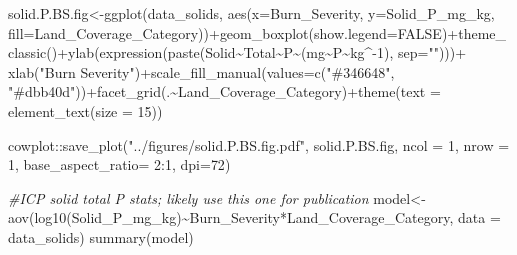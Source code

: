 \documentclass[
]{article}
\newenvironment{Shaded}{\begin{snugshade}}{\end{snugshade}}
\newcommand{\AttributeTok}[1]{\textcolor[rgb]{0.77,0.63,0.00}{#1}}
\newcommand{\CommentTok}[1]{\textcolor[rgb]{0.56,0.35,0.01}{\textit{#1}}}
\newcommand{\ConstantTok}[1]{\textcolor[rgb]{0.00,0.00,0.00}{#1}}
\newcommand{\DecValTok}[1]{\textcolor[rgb]{0.00,0.00,0.81}{#1}}
\newcommand{\FunctionTok}[1]{\textcolor[rgb]{0.00,0.00,0.00}{#1}}
\newcommand{\NormalTok}[1]{#1}
\newcommand{\OtherTok}[1]{\textcolor[rgb]{0.56,0.35,0.01}{#1}}
\newcommand{\SpecialCharTok}[1]{\textcolor[rgb]{0.00,0.00,0.00}{#1}}
\newcommand{\StringTok}[1]{\textcolor[rgb]{0.31,0.60,0.02}{#1}}
\begin{document}
\begin{Shaded}
\begin{Highlighting}[]
\NormalTok{solid.P.BS.fig}\OtherTok{\textless{}{-}}\FunctionTok{ggplot}\NormalTok{(data\_solids, }\FunctionTok{aes}\NormalTok{(}\AttributeTok{x=}\NormalTok{Burn\_Severity, }\AttributeTok{y=}\NormalTok{Solid\_P\_mg\_kg, }\AttributeTok{fill=}\NormalTok{Land\_Coverage\_Category))}\SpecialCharTok{+}\FunctionTok{geom\_boxplot}\NormalTok{(}\AttributeTok{show.legend=}\ConstantTok{FALSE}\NormalTok{)}\SpecialCharTok{+}\FunctionTok{theme\_classic}\NormalTok{()}\SpecialCharTok{+}\FunctionTok{ylab}\NormalTok{(}\FunctionTok{expression}\NormalTok{(}\FunctionTok{paste}\NormalTok{(Solid}\SpecialCharTok{\textasciitilde{}}\NormalTok{Total}\SpecialCharTok{\textasciitilde{}}\NormalTok{P}\SpecialCharTok{\textasciitilde{}}\NormalTok{(mg}\SpecialCharTok{\textasciitilde{}}\NormalTok{P}\SpecialCharTok{\textasciitilde{}}\NormalTok{kg}\SpecialCharTok{\^{}{-}}\DecValTok{1}\NormalTok{), }\AttributeTok{sep=}\StringTok{""}\NormalTok{)))}\SpecialCharTok{+} \FunctionTok{xlab}\NormalTok{(}\StringTok{"Burn Severity"}\NormalTok{)}\SpecialCharTok{+}\FunctionTok{scale\_fill\_manual}\NormalTok{(}\AttributeTok{values=}\FunctionTok{c}\NormalTok{(}\StringTok{"\#346648"}\NormalTok{, }\StringTok{"\#dbb40d"}\NormalTok{))}\SpecialCharTok{+}\FunctionTok{facet\_grid}\NormalTok{(.}\SpecialCharTok{\textasciitilde{}}\NormalTok{Land\_Coverage\_Category)}\SpecialCharTok{+}\FunctionTok{theme}\NormalTok{(}\AttributeTok{text =} \FunctionTok{element\_text}\NormalTok{(}\AttributeTok{size =} \DecValTok{15}\NormalTok{))}

\NormalTok{cowplot}\SpecialCharTok{::}\FunctionTok{save\_plot}\NormalTok{(}\StringTok{"../figures/solid.P.BS.fig.pdf"}\NormalTok{, solid.P.BS.fig, }\AttributeTok{ncol =} \DecValTok{1}\NormalTok{, }\AttributeTok{nrow =} \DecValTok{1}\NormalTok{, }\AttributeTok{base\_aspect\_ratio=} \DecValTok{2}\SpecialCharTok{:}\DecValTok{1}\NormalTok{, }\AttributeTok{dpi=}\DecValTok{72}\NormalTok{)}

\CommentTok{\#ICP solid total P stats; likely use this one for publication}
\NormalTok{model}\OtherTok{\textless{}{-}}\FunctionTok{aov}\NormalTok{(}\FunctionTok{log10}\NormalTok{(Solid\_P\_mg\_kg)}\SpecialCharTok{\textasciitilde{}}\NormalTok{Burn\_Severity}\SpecialCharTok{*}\NormalTok{Land\_Coverage\_Category, }\AttributeTok{data =}\NormalTok{ data\_solids)}
\FunctionTok{summary}\NormalTok{(model)}
\end{Highlighting}
\end{Shaded}
\end{document}

